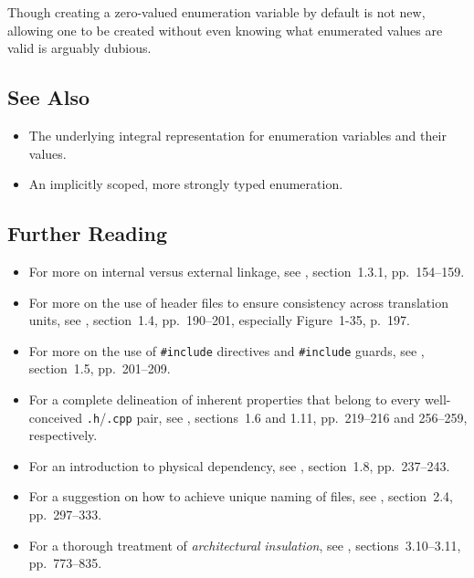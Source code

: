 \noindent Though creating a zero-valued enumeration variable by default is not
new, allowing one to be created without even knowing what enumerated
values are valid is arguably dubious.

\subsection[See Also]{See Also}\label{see-also}

\begin{itemize}
\item{The underlying integral representation for enumeration variables and their values.}
\item{An implicitly scoped, more strongly typed enumeration.}
\end{itemize}

\subsection[Further Reading]{Further Reading}\label{further-reading}

\begin{itemize}
\item{For more on internal versus external linkage, see \cite{lakos20}, section~1.3.1, pp.~154--159.}
\item{For more on the use of header files to ensure consistency across translation units, see \cite{lakos20}, section~1.4, pp.~190--201, especially Figure~1-35, p.~197.}
\item{For more on the use of \lstinline!#include! directives and \lstinline!#include! guards, see \cite{lakos20}, section~1.5, pp.~201--209.}
\item{For a complete delineation of inherent properties that belong to every well-conceived \lstinline!.h!/\lstinline!.cpp! pair, see \cite{lakos20}, sections~1.6 and 1.11, pp.~219--216 and 256--259, respectively.}
\item{For an introduction to physical dependency, see \cite{lakos20}, section~1.8, pp.~237--243.}
\item{For a suggestion on how to achieve unique naming of files, see \cite{lakos20}, section~2.4, pp.~297--333.}
\item{For a thorough treatment of \emph{architectural} \emph{insulation}, see \cite{lakos20}, sections~3.10--3.11, pp.~773--835.}
\end{itemize}

